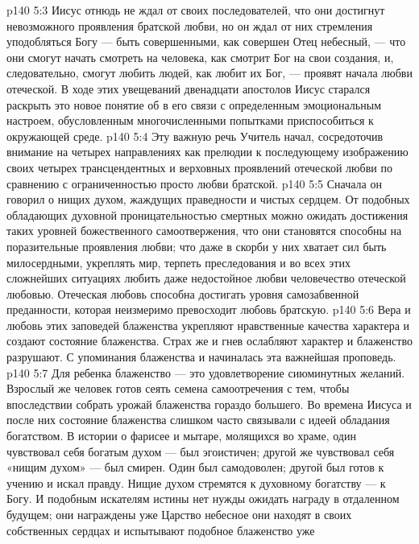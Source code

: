 \vs p140 5:3 Иисус отнюдь не ждал от своих последователей, что они достигнут невозможного проявления братской любви, но он ждал от них стремления уподобляться Богу --- быть совершенными, как совершен Отец небесный, --- что они смогут начать смотреть на человека, как смотрит Бог на свои создания, и, следовательно, смогут любить людей, как любит их Бог, --- проявят начала любви отеческой. В ходе этих увещеваний двенадцати апостолов Иисус старался раскрыть это новое понятие об  в его связи с определенным эмоциональным настроем, обусловленным многочисленными попытками приспособиться к окружающей среде.
\vs p140 5:4 \pc Эту важную речь Учитель начал, сосредоточив внимание на четырех направлениях  как прелюдии к последующему изображению своих четырех трансцендентных и верховных проявлений отеческой любви по сравнению с ограниченностью просто любви братской.
\vs p140 5:5 Сначала он говорил о нищих духом, жаждущих праведности и чистых сердцем. От подобных обладающих духовной проницательностью смертных можно ожидать достижения таких уровней божественного самоотвержения, что они становятся способны на поразительные проявления  любви; что даже в скорби у них хватает сил быть милосердными, укреплять мир, терпеть преследования и во всех этих сложнейших ситуациях любить даже недостойное любви человечество отеческой любовью. Отеческая любовь способна достигать уровня самозабвенной преданности, которая неизмеримо превосходит любовь братскую.
\vs p140 5:6 Вера и любовь этих заповедей блаженства укрепляют нравственные качества характера и создают состояние блаженства. Страх же и гнев ослабляют характер и блаженство разрушают. С упоминания блаженства и начиналась эта важнейшая проповедь.
\vs p140 5:7 \pc {}\bibnobreakspace {} Для ребенка блаженство --- это удовлетворение сиюминутных желаний. Взрослый же человек готов сеять семена самоотречения с тем, чтобы впоследствии собрать урожай блаженства гораздо большего. Во времена Иисуса и после них состояние блаженства слишком часто связывали с идеей обладания богатством. В истории о фарисее и мытаре, молящихся во храме, один чувствовал себя богатым духом --- был эгоистичен; другой же чувствовал себя «нищим духом» --- был смирен. Один был самодоволен; другой был готов к учению и искал правду. Нищие духом стремятся к духовному богатству --- к Богу. И подобным искателям истины нет нужды ожидать награду в отдаленном будущем; они награждены уже  Царство небесное они находят в своих собственных сердцах и испытывают подобное блаженство уже 
